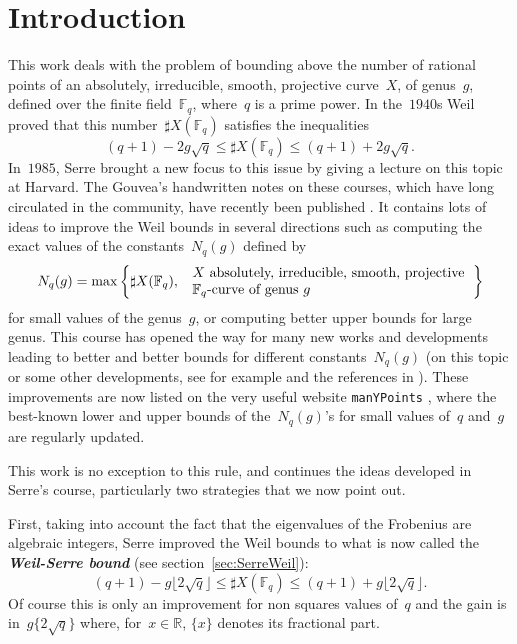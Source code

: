 \documentclass{amsart}
\newcommand{\R}{\mathbb{R}}
\newcommand{\F}{\mathbb{F}}
\begin{document}
\setcounter{tocdepth}{1} 


\section*{Introduction}

This work deals with the problem of bounding above the number of rational points of an absolutely, irreducible, smooth, projective
curve~$X$, of genus~$g$, defined over the finite field~$\F_q$, where~$q$ is a prime power.
In the~$1940$s Weil \cite{Weil1,Weil2} proved that this
number~$\sharp X(\F_q)$ satisfies the inequalities
$$
(q+1) -2g\sqrt{q} \leq \sharp X(\F_q) \leq (q+1) + 2g\sqrt{q}.
$$
In~$1985$, Serre brought a new focus to this issue by giving a lecture on this topic at Harvard. The Gouvea's handwritten notes on these
courses, which have long circulated in the community, have recently been published \cite{SerreRP}. It contains lots of ideas to
improve the Weil bounds in several directions such as computing the exact values of the constants~$N_q(g)$ defined by
\[
N_q(g) = \max\left\{\sharp X(\F_q), \; \text{\begin{tabular}{l}$X$ absolutely, irreducible, smooth, projective\\$\F_q$-curve
of genus~$g$\end{tabular}}\right\}
\]
for small values of the genus~$g$, or computing better upper bounds for large genus. This course has opened the way for many new works
and developments leading to better and better bounds for different constants~$N_q(g)$
(on this topic or some other developments, see for example \cite{AubryIezzi,HoweF4,MR3349314,MR2961401,HL03,HL12,HL07,MR4876845} and the references in \cite{SerreRP}).
These improvements are now listed on the very useful website {\tt manYPoints} \cite{MP}, where the best-known lower and upper bounds
of the~$N_q(g)$'s for
small values of~$q$ and~$g$ are regularly updated.

This work is no exception to this rule, and continues the ideas developed in Serre's course, particularly two strategies
that we now point out.

First, taking into account the fact that the eigenvalues of the Frobenius are algebraic integers, Serre improved the Weil
bounds \cite{SerreWS} to what is now called the {\bf\em Weil-Serre bound}
(see section~\ref{sec:SerreWeil}):
$$
 (q+1) -g\lfloor2\sqrt{q}\rfloor \leq \sharp X(\F_q) \leq  (q+1) + g\lfloor2\sqrt{q}\rfloor.
$$
Of course this is only an improvement for non squares values of~$q$ and the gain is in~$g\{2\sqrt{q}\}$ where, for~$x\in\R$,
$\{x\}$ denotes its fractional part.
\end{document}

